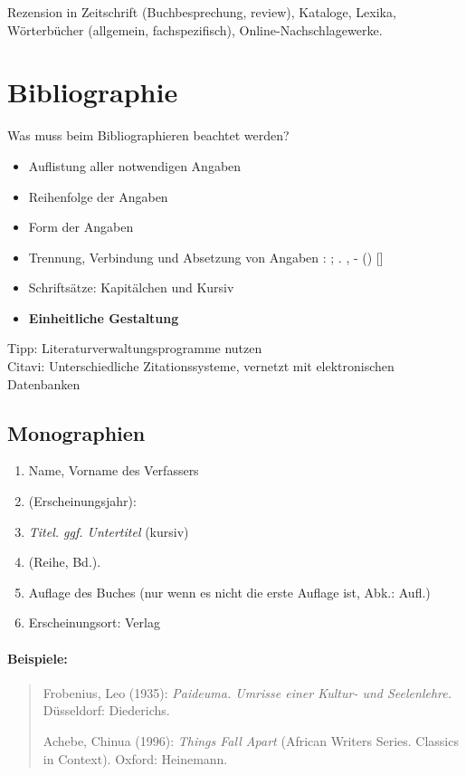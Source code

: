 \documentclass[ 12pt,
                titlepage,
                parskip=half,
                version=first,
                bibliography=totocnumbered,
                final,
                listof=totoc]{scrartcl}
\begin{document}
Rezension in Zeitschrift (Buchbesprechung, review), Kataloge, Lexika,
Wörterbücher (allgemein, fachspezifisch), Online-Nachschlagewerke.

\section{Bibliographie}
\label{sec:bibliographie}

\begin{description}
    \item[Was muss beim Bibliographieren beachtet werden?]
\end{description}
\begin{itemize}
    \item Auflistung aller notwendigen Angaben
    \item Reihenfolge der Angaben
    \item Form der Angaben
    \item Trennung, Verbindung und Absetzung von Angaben : ; . , - () []
    \item Schriftsätze: Kapitälchen und Kursiv
    \item \textbf{Einheitliche Gestaltung}
\end{itemize}

Tipp: Literaturverwaltungsprogramme nutzen\\ Citavi: Unterschiedliche
Zitationssysteme, vernetzt mit elektronischen Datenbanken

\subsection{Monographien}
\label{sec:sub_monographien}

\begin{enumerate}
    \item Name, Vorname des Verfassers
    \item (Erscheinungsjahr):
    \item \emph{Titel. ggf. Untertitel} (kursiv)
    \item (Reihe, Bd.).
    \item Auflage des Buches (nur wenn es nicht die erste Auflage ist, Abk.:
    Aufl.)
    \item Erscheinungsort: Verlag
\end{enumerate}

\paragraph{Beispiele:}
\begin{quote}
Frobenius, Leo (1935): \emph{Paideuma. Umrisse einer Kultur- und Seelenlehre.}
Düsseldorf: Diederichs.

Achebe, Chinua (1996): \emph{Things Fall Apart} (African Writers Series.
Classics in Context). Oxford: Heinemann.
\end{quote}
\end{document}
